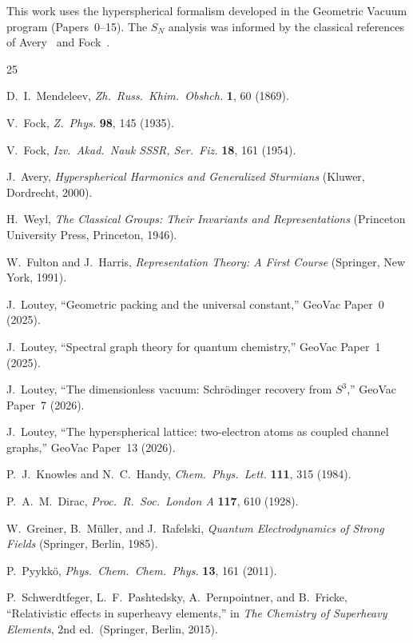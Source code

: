 \documentclass[aps,prl,twocolumn,superscriptaddress,longbibliography]{revtex4-2}
\begin{document}
\begin{acknowledgments}
This work uses the hyperspherical formalism developed in the Geometric
Vacuum program (Papers~0--15).  The $S_N$ analysis was informed by the
classical references of Avery~\cite{Avery2000} and
Fock~\cite{Fock1935, Fock1954}.
\end{acknowledgments}


\begin{thebibliography}{25}

D.~I.~Mendeleev,
\emph{Zh.\ Russ.\ Khim.\ Obshch.} \textbf{1}, 60 (1869).

V.~Fock,
\emph{Z.\ Phys.} \textbf{98}, 145 (1935).

V.~Fock,
\emph{Izv.\ Akad.\ Nauk SSSR, Ser.\ Fiz.} \textbf{18}, 161 (1954).

J.~Avery,
\emph{Hyperspherical Harmonics and Generalized Sturmians}
(Kluwer, Dordrecht, 2000).

H.~Weyl,
\emph{The Classical Groups: Their Invariants and Representations}
(Princeton University Press, Princeton, 1946).

W.~Fulton and J.~Harris,
\emph{Representation Theory: A First Course}
(Springer, New York, 1991).

J.~Loutey,
``Geometric packing and the universal constant,''
GeoVac Paper~0 (2025).

J.~Loutey,
``Spectral graph theory for quantum chemistry,''
GeoVac Paper~1 (2025).

J.~Loutey,
``The dimensionless vacuum: Schr\"odinger recovery from $S^3$,''
GeoVac Paper~7 (2026).

J.~Loutey,
``The hyperspherical lattice: two-electron atoms as coupled channel
graphs,''
GeoVac Paper~13 (2026).

P.~J.~Knowles and N.~C.~Handy,
\emph{Chem.\ Phys.\ Lett.} \textbf{111}, 315 (1984).

P.~A.~M.~Dirac,
\emph{Proc.\ R.\ Soc.\ London A} \textbf{117}, 610 (1928).

W.~Greiner, B.~M\"uller, and J.~Rafelski,
\emph{Quantum Electrodynamics of Strong Fields}
(Springer, Berlin, 1985).

P.~Pyykk\"o,
\emph{Phys.\ Chem.\ Chem.\ Phys.} \textbf{13}, 161 (2011).

P.~Schwerdtfeger, L.~F.~Pashtedsky, A.~Pernpointner, and B.~Fricke,
``Relativistic effects in superheavy elements,''
in \emph{The Chemistry of Superheavy Elements}, 2nd ed.\
(Springer, Berlin, 2015).

\end{thebibliography}
\end{document}
